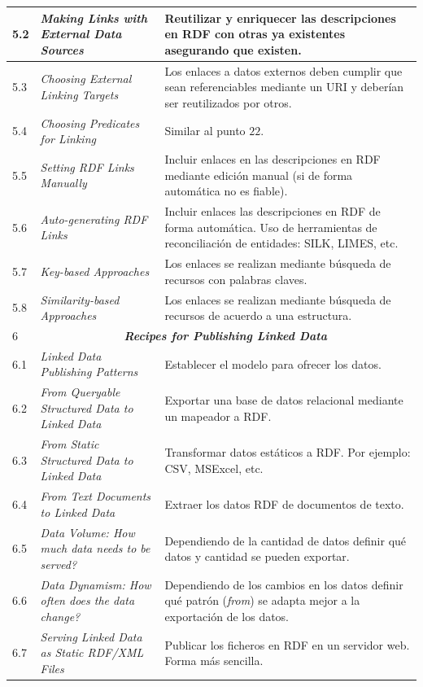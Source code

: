 \begin{longtable}[c]{|l|p{7cm}|p{8cm}|}
   5.2 &  \textit{Making Links with External Data Sources} &  Reutilizar y enriquecer las descripciones en RDF con otras ya existentes asegurando que existen.\\ \hline
   5.3 &  \textit{Choosing External Linking Targets} & Los enlaces a datos externos deben cumplir que sean referenciables mediante un URI y deberían ser reutilizados por otros.\\ \hline
   5.4 &  \textit{Choosing Predicates for Linking} & Similar al punto $22$.\\ \hline
   5.5 &  \textit{Setting RDF Links Manually} & Incluir enlaces en las descripciones en RDF mediante edición manual (si de forma automática no es fiable).\\ \hline
   5.6 &  \textit{Auto-generating RDF Links} & Incluir enlaces las descripciones en RDF de forma automática. Uso de herramientas de reconciliación de entidades: SILK, LIMES, etc.\\ \hline
   5.7 &  \textit{Key-based Approaches} & Los enlaces se realizan mediante búsqueda de recursos con palabras claves.\\ \hline
   5.8 &  \textit{Similarity-based Approaches} & Los enlaces se realizan mediante búsqueda de recursos de acuerdo a una estructura.\\ \hline
  6&\multicolumn{2}{|c|}{\textbf{\textit{Recipes for Publishing Linked Data}}}\\ \hline
   6.1 &  \textit{Linked Data Publishing Patterns} & Establecer el modelo para ofrecer los datos.\\ \hline
   6.2 &  \textit{From Queryable Structured Data to Linked Data} & Exportar una base de datos relacional mediante un mapeador a RDF.\\ \hline
   6.3 &  \textit{From Static Structured Data to Linked Data} & Transformar datos estáticos a RDF. Por ejemplo: CSV, MSExcel, etc.\\ \hline
   6.4 &  \textit{From Text Documents to Linked Data} & Extraer los datos RDF de documentos de texto.\\ \hline
   6.5 &  \textit{Data Volume: How much data needs to be served?} & Dependiendo de la cantidad de datos definir qué datos y cantidad se pueden exportar.\\ \hline
   6.6 &  \textit{Data Dynamism: How often does the data change?} & Dependiendo de los cambios en los datos definir qué patrón (\textit{from}) se adapta mejor a la exportación de los datos.\\ \hline
   6.7 &  \textit{Serving Linked Data as Static RDF/XML Files} & Publicar los ficheros en RDF en un servidor web. Forma más sencilla.\\ \hline

\end{longtable}
